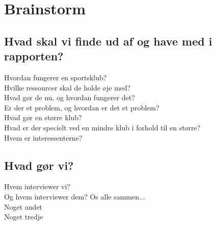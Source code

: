 \chapter{Brainstorm}\label{ch:ch2label}


\section{Hvad skal vi finde ud af og have med i rapporten?}
Hvordan fungerer en sportsklub?\\
Hvilke ressourcer skal de holde øje med?\\
Hvad gør de nu, og hvordan fungerer det?\\
Er der et problem, og hvordan er det et problem?\\
Hvad gør en større klub?\\
Hvad er der specielt ved en mindre klub i forhold til en større?\\
Hvem er interessenterne?\\

\section{Hvad gør vi?}
Hvem interviewer vi?\\
Og hvem interviewer dem? Os alle sammen...\\
Noget andet\\
Noget tredje\\


















